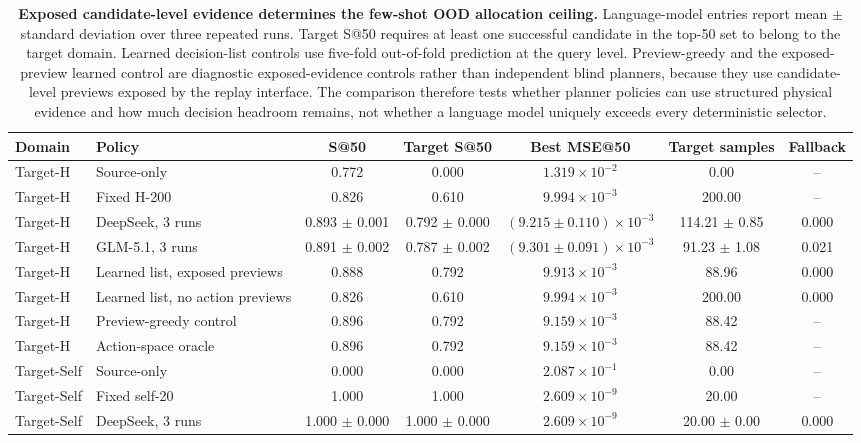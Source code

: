 \documentclass[final,1p,times]{elsarticle}
\renewcommand{\arraystretch}{1.5}
\begin{document}
\begin{table}[t]
\centering
\caption{\textbf{Exposed candidate-level evidence determines the few-shot OOD allocation ceiling.}
Language-model entries report mean $\pm$ standard deviation over three repeated runs. Target S@50 requires at least one successful candidate in the top-50 set to belong to the target domain. Learned decision-list controls use five-fold out-of-fold prediction at the query level. Preview-greedy and the exposed-preview learned control are diagnostic exposed-evidence controls rather than independent blind planners, because they use candidate-level previews exposed by the replay interface. The comparison therefore tests whether planner policies can use structured physical evidence and how much decision headroom remains, not whether a language model uniquely exceeds every deterministic selector.}
\label{tab:phase4}
\footnotesize
\setlength{\tabcolsep}{4.0pt}
\renewcommand{\arraystretch}{1.12}
\begin{tabular}{llccccc}
\toprule
Domain & Policy & S@50 & Target S@50 & Best MSE@50 & Target samples & Fallback \\
\midrule
Target-H & Source-only & 0.772 & 0.000 & $1.319\times10^{-2}$ & 0.00 & -- \\
Target-H & Fixed H-200 & 0.826 & 0.610 & $9.994\times10^{-3}$ & 200.00 & -- \\
Target-H & DeepSeek, 3 runs & 0.893 $\pm$ 0.001 & 0.792 $\pm$ 0.000 & $(9.215\pm0.110)\times10^{-3}$ & 114.21 $\pm$ 0.85 & 0.000 \\
Target-H & GLM-5.1, 3 runs & 0.891 $\pm$ 0.002 & 0.787 $\pm$ 0.002 & $(9.301\pm0.091)\times10^{-3}$ & 91.23 $\pm$ 1.08 & 0.021 \\
Target-H & Learned list, exposed previews & 0.888 & 0.792 & $9.913\times10^{-3}$ & 88.96 & 0.000 \\
Target-H & Learned list, no action previews & 0.826 & 0.610 & $9.994\times10^{-3}$ & 200.00 & 0.000 \\
Target-H & Preview-greedy control & 0.896 & 0.792 & $9.159\times10^{-3}$ & 88.42 & -- \\
Target-H & Action-space oracle & 0.896 & 0.792 & $9.159\times10^{-3}$ & 88.42 & -- \\
\midrule
Target-Self & Source-only & 0.000 & 0.000 & $2.087\times10^{-1}$ & 0.00 & -- \\
Target-Self & Fixed self-20 & 1.000 & 1.000 & $2.609\times10^{-9}$ & 20.00 & -- \\
Target-Self & DeepSeek, 3 runs & 1.000 $\pm$ 0.000 & 1.000 $\pm$ 0.000 & $2.609\times10^{-9}$ & 20.00 $\pm$ 0.00 & 0.000 \\

\end{tabular}
\end{table}
\end{document}
